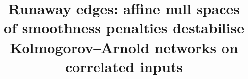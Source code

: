 \title{Runaway edges: affine null spaces of smoothness penalties destabilise Kolmogorov--Arnold networks on correlated inputs}
